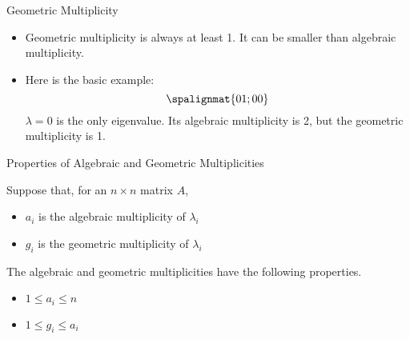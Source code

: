 \begin{frame}{Geometric Multiplicity}

    \begin{center}\end{center}
    \vspace{-6pt}
    \begin{itemize}
        \item  Geometric multiplicity is always at least 1.  It can be smaller than algebraic multiplicity. 
        
        \item  Here is the basic example:  
         \[ \spalignmat{ 0 1 ; 0 0 } \]
         $\lambda =0$ is the only eigenvalue. Its algebraic multiplicity is 2, but the geometric multiplicity is 1.  
    \end{itemize}

\end{frame}




\begin{frame}{Properties of Algebraic and Geometric Multiplicities}

    Suppose that, for an $n\times n$ matrix $A$,
    \begin{itemize}
        \item $a_i$ is the algebraic multiplicity of $\lambda_i$
        \item $g_i$ is the geometric multiplicity of $\lambda_i$
    \end{itemize}
    
    \pause 
    
    \vspace{12pt}
    The algebraic and geometric multiplicities have the following properties. 
    \begin{itemize}
        \item $1 \le a_i \le n$
        \item $1 \le g_i \le a_i$
    \end{itemize}
    
\end{frame}




